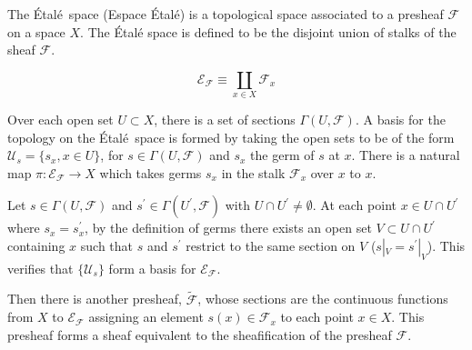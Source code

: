 \documentclass[12pt]{article}
\newcommand{\sheaf}[1]{\mathcal{#1}}
\newcommand{\Etale}[0]{\'Etal\'e}
\begin{document}
The \Etale~space (Espace \Etale) is a topological space associated to a presheaf $\sheaf F$ on a space $X$.  The \'Etal\'e space is defined to be the disjoint union of stalks of the sheaf $\sheaf F$. 

\[\sheaf E_{\sheaf F} \equiv \coprod_{x\in X} \sheaf F_x\]


Over each open set $U\subset X$, there is a set of sections $\Gamma(U,\sheaf F)$.  A basis for the topology on the \Etale~space is formed by taking the open sets to be of the form $\sheaf U_s = \{s_x, x\in U\}$, for $s\in \Gamma(U,\sheaf F)$ and $s_x$ the germ of $s$ at $x$. There is a natural map $\pi\!:\!\sheaf E_{\sheaf F} \rightarrow X$ which takes germs $s_x$ in the stalk $\sheaf F_x$ over $x$ to $x$.


Let $s\in \Gamma(U,\sheaf F)$ and $s^\prime \in \Gamma(U^\prime,\sheaf F)$ with $U\cap U^\prime \ne \emptyset$. At each point $x\in U \cap U^\prime$ where $s_x = s^\prime_x$, by the definition of germs there exists an open set $V\subset U\cap U^\prime$ containing $x$ such that $s$ and $s^\prime$ restrict to the same section on $V$ ($s|_V = s^\prime|_V$).  This verifies that $\{\sheaf U_s\}$ form a basis for $\sheaf E_{\sheaf F}$.

Then there is another presheaf, $\widetilde{\sheaf F}$, whose sections are the continuous functions from $X$ to $\sheaf E_{\sheaf F}$ assigning an element $s(x)\in \sheaf F_x$ to each point $x \in X$.  This presheaf forms a sheaf equivalent to the sheafification of the presheaf $\sheaf F$.
\end{document}
